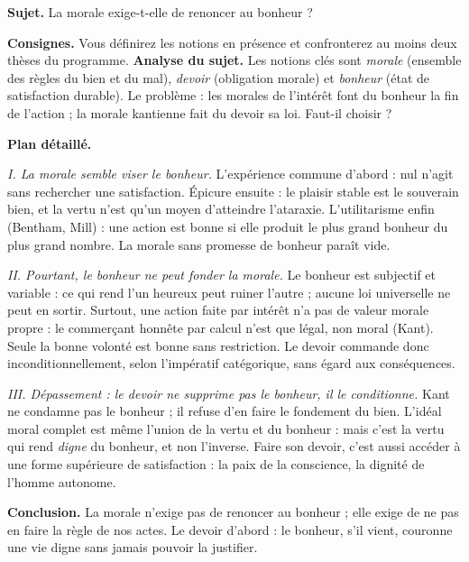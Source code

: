 \documentclass[11pt]{article}
\begin{document}
\begin{exoresolu}
\textbf{Sujet.} La morale exige-t-elle de renoncer au bonheur ?

\textbf{Consignes.} Vous définirez les notions en présence et confronterez au moins deux thèses du programme.
\tcblower
\textbf{Analyse du sujet.} Les notions clés sont \emph{morale} (ensemble des règles du bien et du mal), \emph{devoir} (obligation morale) et \emph{bonheur} (état de satisfaction durable). Le problème : les morales de l'intérêt font du bonheur la fin de l'action ; la morale kantienne fait du devoir sa loi. Faut-il choisir ?

\textbf{Plan détaillé.}

\emph{I. La morale semble viser le bonheur.} L'expérience commune d'abord : nul n'agit sans rechercher une satisfaction. Épicure ensuite : le plaisir stable est le souverain bien, et la vertu n'est qu'un moyen d'atteindre l'ataraxie. L'utilitarisme enfin (Bentham, Mill) : une action est bonne si elle produit le plus grand bonheur du plus grand nombre. La morale sans promesse de bonheur paraît vide.

\emph{II. Pourtant, le bonheur ne peut fonder la morale.} Le bonheur est subjectif et variable : ce qui rend l'un heureux peut ruiner l'autre ; aucune loi universelle ne peut en sortir. Surtout, une action faite par intérêt n'a pas de valeur morale propre : le commerçant honnête par calcul n'est que légal, non moral (Kant). Seule la bonne volonté est bonne sans restriction. Le devoir commande donc inconditionnellement, selon l'impératif catégorique, sans égard aux conséquences.

\emph{III. Dépassement : le devoir ne supprime pas le bonheur, il le conditionne.} Kant ne condamne pas le bonheur ; il refuse d'en faire le fondement du bien. L'idéal moral complet est même l'union de la vertu et du bonheur : mais c'est la vertu qui rend \emph{digne} du bonheur, et non l'inverse. Faire son devoir, c'est aussi accéder à une forme supérieure de satisfaction : la paix de la conscience, la dignité de l'homme autonome.

\textbf{Conclusion.} La morale n'exige pas de renoncer au bonheur ; elle exige de ne pas en faire la règle de nos actes. Le devoir d'abord : le bonheur, s'il vient, couronne une vie digne sans jamais pouvoir la justifier.
\end{exoresolu}
\end{document}

